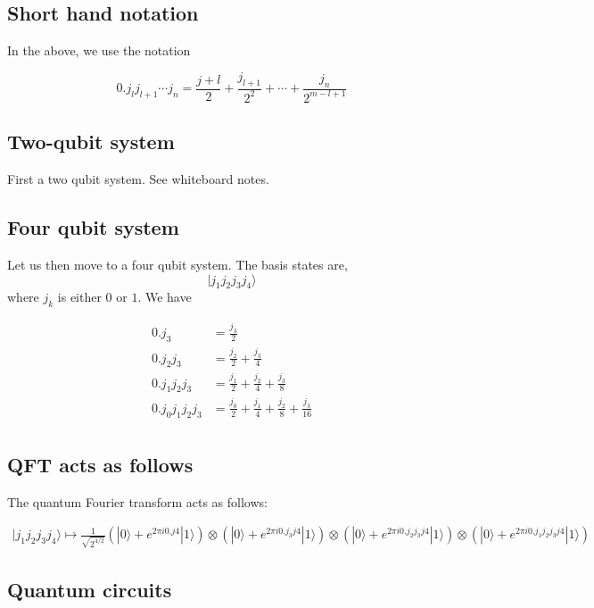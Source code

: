 \documentclass[%
oneside,                 %
final,                   %
10pt]{article}
\begin{document}
\subsection{Short hand notation}

In the above, we use the notation

\[
0.j_lj_{l+1} \cdots j_n = \frac{j+l}{2} + \frac{j_{l+1}}{2^2} + \cdots + \frac{j_n}{2^{m-l+1}}
\]

\subsection{Two-qubit system}

First a two qubit system. See whiteboard notes.

\subsection{Four qubit system}
Let us then move to  a four qubit system. The basis states are,
\[
|j_1j_2j_3j_4 \rangle
\]
where \(j_k\) is either \(0\) or \(1\). We have

\begin{align*}
0.j_3 &= \frac{j_3}{2} \\
0.j_2j_3 &= \frac{j_2}{2} + \frac{j_3}{4} \\
0.j_1j_2j_3 &= \frac{j_1}{2} + \frac{j_2}{4} + \frac{j_3}{8} \\
0.j_0j_1j_2j_3 &= \frac{j_0}{2} + \frac{j_1}{4} + \frac{j_2}{8} + \frac{j_3}{16} \\
\end{align*}

\subsection{QFT acts as follows}

The quantum Fourier transform acts as follows:

\begin{align*}
|j_1j_2j_3j_4 \rangle \mapsto \frac{1}{\sqrt{2^{4/2}}}
\left(|0\rangle + e^{2 \pi i 0.j4}|1\rangle \right) \otimes 
\left(|0\rangle + e^{2 \pi i 0.j_3j4}|1\rangle \right) \otimes 
\left(|0\rangle + e^{2 \pi i 0.j_2j_3j4}|1\rangle \right) \otimes 
\left(|0\rangle + e^{2 \pi i 0.j_1j_2j_3j4}|1\rangle \right) 
\end{align*}

\subsection{Quantum circuits}
\end{document}

